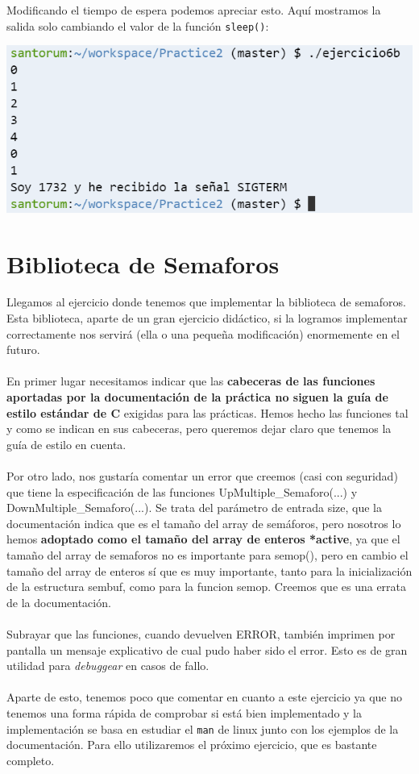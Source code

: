 \documentclass[12pt]{article}
\begin{document}
Modificando el tiempo de espera podemos apreciar esto. Aquí mostramos la salida solo cambiando el valor de la función \texttt{sleep()}:
\begin{center}
	\includegraphics[scale=0.9]{ej6b_2.PNG}
\end{center}


\section{Biblioteca de Semaforos}
Llegamos al ejercicio donde tenemos que implementar la biblioteca de semaforos. Esta biblioteca, aparte de un gran ejercicio didáctico, si la logramos implementar correctamente nos servirá (ella o una pequeña modificación) enormemente en el futuro.\\\\
En primer lugar necesitamos indicar que las \textbf{cabeceras de las funciones aportadas por la documentación de la práctica no siguen la guía de estilo estándar de C} exigidas para las prácticas. Hemos hecho las funciones tal y como se indican en sus cabeceras, pero queremos dejar claro que tenemos la guía de estilo en cuenta.\\\\
Por otro lado, nos gustaría comentar un error que creemos (casi con seguridad) que tiene la especificación de las funciones UpMultiple\_Semaforo(...) y DownMultiple\_Semaforo(...). Se trata del parámetro de entrada size, que la documentación indica que es el tamaño del array de semáforos, pero nosotros lo hemos \textbf{adoptado como el tamaño del array de enteros *active}, ya que el tamaño del array de semaforos no es importante para semop(), pero en cambio el tamaño del array de enteros sí que es muy importante, tanto para la inicialización de la estructura sembuf, como para la funcion semop. Creemos que es una errata de la documentación.\\\\
Subrayar que las funciones, cuando devuelven ERROR, también imprimen por pantalla un mensaje explicativo de cual pudo haber sido el error. Esto es de gran utilidad para \emph{debuggear} en casos de fallo.\\\\
Aparte de esto, tenemos poco que comentar en cuanto a este ejercicio ya que no tenemos una forma rápida de comprobar si está bien implementado y la implementación se basa en estudiar el \texttt{man} de linux junto con los ejemplos de la documentación. Para ello utilizaremos el próximo ejercicio, que es bastante completo.\\\\
\end{document}
